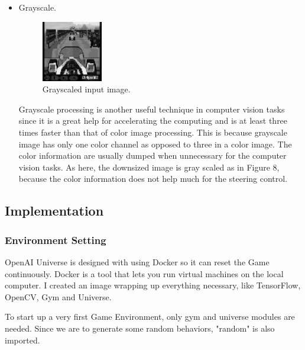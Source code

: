 \documentclass[a4paper]{article}
\begin{document}
\begin{itemize}
    \item Grayscale.

	\begin{figure}[h]
	\centering
	\includegraphics[width=0.25\textwidth]{coaster-racer-vision-grayscaled}
	\caption{Grayscaled input image.}
	\end{figure}
    
   Grayscale processing is another useful technique in computer vision tasks since it is a great help for accelerating the computing and is at least three times faster than that of color image processing. This is because grayscale image has only one color channel as opposed to three in a color image.  The color information are usually dumped when unnecessary for the computer vision tasks. As here, the downsized image is gray scaled as in Figure 8, because the color information does not help much for the steering control. 

\end{itemize}

\subsection{Implementation}

\subsubsection{Environment Setting}

OpenAI Universe is designed with using Docker so it can reset the Game continuously. Docker is a tool that lets you run virtual machines on the local computer. I created an image wrapping up everything necessary, like TensorFlow, OpenCV, Gym and Universe.

To start up a very first Game Environment, only gym and universe modules are needed. Since we are to generate some random behaviors, "random" is also imported.
\end{document}
